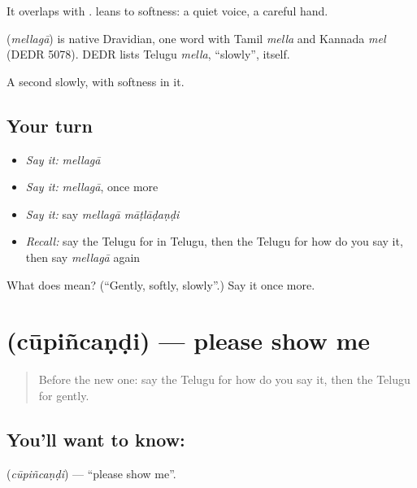 It overlaps with \textbf{}. \textbf{} leans to softness: a quiet voice, a careful hand.

\begin{cousinweb}
\textbf{} (\emph{mellagā}) is native Dravidian, one word with Tamil \emph{mella} and Kannada \emph{mel} (DEDR 5078). DEDR lists Telugu \emph{mella}, \textquotedblleft{}slowly\textquotedblright{}, itself.
\end{cousinweb}

\begin{grammarlens}[title={What you've built}]
A second slowly, with softness in it.
\end{grammarlens}

\subsection*{Your turn}
\begin{itemize}
\raggedright
  \item \emph{Say it:} \emph{mellagā}
  \item \emph{Say it:} \emph{mellagā}, once more
  \item \emph{Say it:} say \emph{mellagā māṭlāḍaṇḍi}
  \item \emph{Recall:} say the Telugu for in Telugu, then the Telugu for how do you say it, then say \emph{mellagā} again
\end{itemize}

\begin{tcolorbox}[breakable,colback=teal!4,colframe=teal!35!black,title={Before you move on}]
What does  mean? (\textquotedblleft{}Gently, softly, slowly\textquotedblright{}.) Say it once more.
\end{tcolorbox}
\section[\texorpdfstring{\te{చూపించండి} (cūpiñcaṇḍi)}{చూపించండి (cūpiñcaṇḍi)}]{ (cūpiñcaṇḍi) — please show me}

\label{lesson:TE-C95-show}



\begin{quote}
Before the new one: say the Telugu for how do you say it, then the Telugu for gently.
\end{quote}

\subsection*{You'll want to know: }
\textbf{} (\emph{cūpiñcaṇḍi}) — \textquotedblleft{}please show me\textquotedblright{}.

